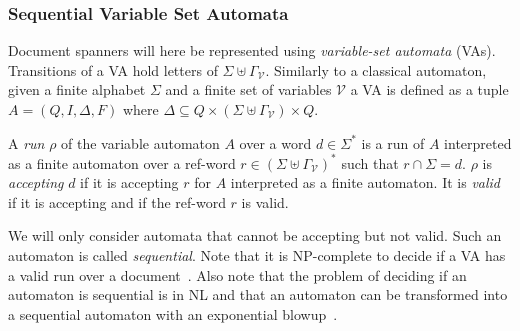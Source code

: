 \documentclass[12px]{article}
\begin{document}
      \subsubsection{Sequential Variable Set Automata}

        Document spanners will here be represented using \textit{variable-set
        automata} (VAs). Transitions of a VA hold letters of $\Sigma \uplus
        \Gamma_\mathcal{V}$.  Similarly to a classical automaton, given a
        finite alphabet $\Sigma$ and a finite set of variables $\mathcal{V}$ a
        VA is defined as a tuple $A = (Q, I, \Delta, F)$ where $\Delta
        \subseteq Q \times (\Sigma \uplus \Gamma_\mathcal{V}) \times Q$.

        A \textit{run} $\rho$ of the variable automaton $A$ over a word $d \in
        \Sigma^*$ is a run of $A$ interpreted as a finite automaton over a
        ref-word $r \in {(\Sigma \uplus \Gamma_\mathcal{V})}^*$ such that $r
        \cap \Sigma = d$. $\rho$ is \textit{accepting} $d$ if it is accepting
        $r$ for $A$ interpreted as a finite automaton. It is \textit{valid} if
        it is accepting and if the ref-word $r$ is valid.



        We will only consider automata that cannot be accepting but not valid.
        Such an automaton is called \textit{sequential}. Note that it is
        NP-complete to decide if a VA has a valid run over a
        document~\cite{freydenberger:LIPIcs:2017}. Also note that the problem
        of deciding if an automaton is sequential is in NL and that an
        automaton can be transformed into a sequential automaton with an
        exponential blowup~\cite{ICDT19}.
\end{document}

